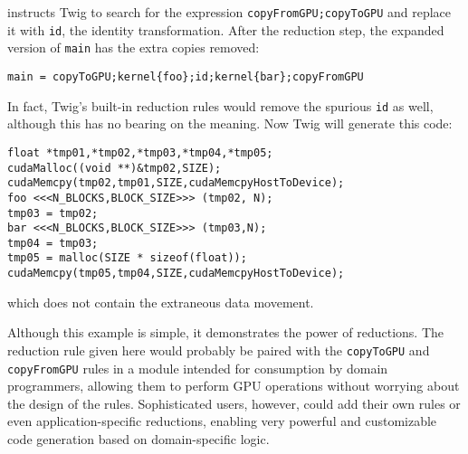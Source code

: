 instructs Twig to search for the expression \texttt{copyFromGPU;copyToGPU} and replace it with \texttt{id}, the identity transformation. After the reduction step, the expanded version of \texttt{main} has the extra copies removed:

\begin{verbatim}
main = copyToGPU;kernel{foo};id;kernel{bar};copyFromGPU
\end{verbatim}

In fact, Twig's built-in reduction rules would remove the spurious \texttt{id} as well, although this has no bearing on the meaning. Now Twig will generate this code:

\begin{verbatim}
float *tmp01,*tmp02,*tmp03,*tmp04,*tmp05;
cudaMalloc((void **)&tmp02,SIZE);
cudaMemcpy(tmp02,tmp01,SIZE,cudaMemcpyHostToDevice);
foo <<<N_BLOCKS,BLOCK_SIZE>>> (tmp02, N);
tmp03 = tmp02;
bar <<<N_BLOCKS,BLOCK_SIZE>>> (tmp03,N);
tmp04 = tmp03;
tmp05 = malloc(SIZE * sizeof(float));
cudaMemcpy(tmp05,tmp04,SIZE,cudaMemcpyHostToDevice);
\end{verbatim}

which does not contain the extraneous data movement.

Although this example is simple, it demonstrates the power of reductions. The reduction rule given here would probably be paired with the \texttt{copyToGPU} and \texttt{copyFromGPU} rules in a module intended for consumption by domain programmers, allowing them to perform GPU operations without worrying about the design of the rules. Sophisticated users, however, could add their own rules or even application-specific reductions, enabling very powerful and customizable code generation based on domain-specific logic.
